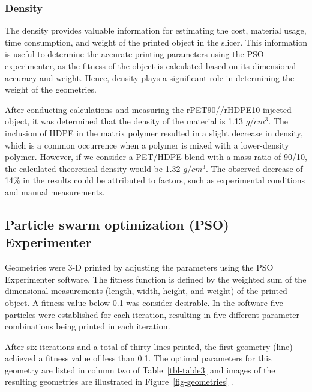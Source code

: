\documentclass[
  letterpaper,
  DIV=11,
  numbers=noendperiod]{scrartcl}
\begin{document}
\hypertarget{density-1}{%
\subsubsection{Density}\label{density-1}}

The density provides valuable information for estimating the cost,
material usage, time consumption, and weight of the printed object in
the slicer. This information is useful to determine the accurate
printing parameters using the PSO experimenter, as the fitness of the
object is calculated based on its dimensional accuracy and weight.
Hence, density plays a significant role in determining the weight of the
geometries.

After conducting calculations and measuring the rPET90//rHDPE10 injected
object, it was determined that the density of the material is 1.13
\(g/cm^{3}\). The inclusion of HDPE in the matrix polymer resulted in a
slight decrease in density, which is a common occurrence when a polymer
is mixed with a lower-density polymer. However, if we consider a
PET/HDPE blend with a mass ratio of 90/10, the calculated theoretical
density would be 1.32 \(g/cm^{3}\). The observed decrease of 14\% in the
results could be attributed to factors, such as experimental conditions
and manual measurements.

\hypertarget{particle-swarm-optimization-pso-experimenter}{%
\subsection{Particle swarm optimization (PSO)
Experimenter}\label{particle-swarm-optimization-pso-experimenter}}

Geometries were 3-D printed by adjusting the parameters using the PSO
Experimenter software. The fitness function is defined by the weighted
sum of the dimensional measurements (length, width, height, and weight)
of the printed object. A fitness value below 0.1 was consider desirable.
In the software five particles were established for each iteration,
resulting in five different parameter combinations being printed in each
iteration.

After six iterations and a total of thirty lines printed, the first
geometry (line) achieved a fitness value of less than 0.1. The optimal
parameters for this geometry are listed in column two of
Table~\ref{tbl-table3} and images of the resulting geometries are
illustrated in Figure~\ref{fig-geometries} .
\end{document}
